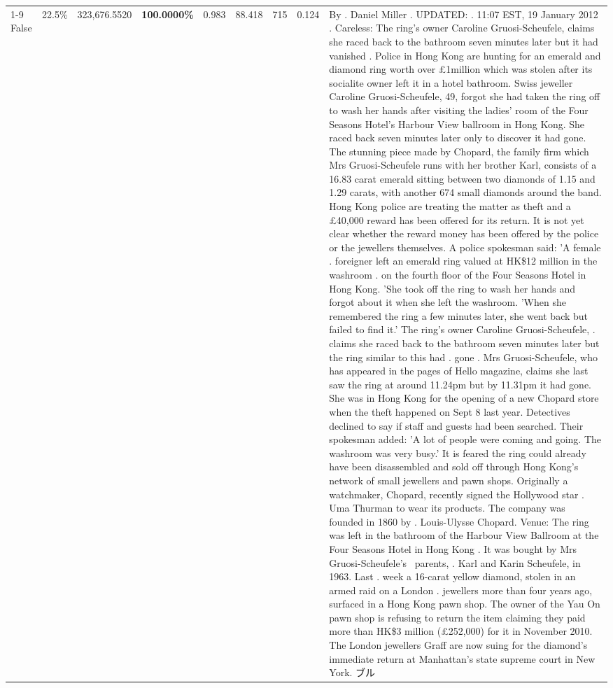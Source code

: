 \begin{table}[H]
\begin{tabular}{lllrlllll}
\cline{1-9} \cline{2-9}
False & 22.5\% & 323,676.5520 & \bfseries \color{red} 100.0000\% & 0.983 & 88.418 & 715 & 0.124 & By . Daniel Miller . UPDATED: . 11:07 EST, 19 January 2012 . Careless: The ring's owner Caroline Gruosi-Scheufele, claims she raced back to the bathroom seven minutes later but it had vanished . Police in Hong Kong are hunting for an emerald and diamond ring worth over £1million which was stolen after its socialite owner left it in a hotel bathroom. Swiss jeweller Caroline Gruosi-Scheufele, 49, forgot she had taken the ring off to wash her hands after visiting the ladies' room of the Four Seasons Hotel's Harbour View ballroom in Hong Kong. She raced back seven minutes later only to discover it had gone. The stunning piece made by Chopard, the family firm which Mrs Gruosi-Scheufele runs with her brother Karl, consists of a 16.83 carat emerald sitting between two diamonds of 1.15 and 1.29 carats, with another 674 small diamonds around the band. Hong Kong police are treating the matter as theft and a £40,000 reward has been offered for its return. It is not yet clear whether the reward money has been offered by the police or the jewellers themselves. A police spokesman said: 'A female . foreigner left an emerald ring valued at HK\$12 million in the washroom . on the fourth floor of the Four Seasons Hotel in Hong Kong. 'She took off the ring to wash her hands and forgot about it when she left the washroom. 'When she remembered the ring a few minutes later, she went back but failed to find it.' The ring's owner Caroline Gruosi-Scheufele, . claims she raced back to the bathroom seven minutes later but the ring similar to this had . gone . Mrs Gruosi-Scheufele, who has appeared in the pages of Hello magazine, claims she last saw the ring at around 11.24pm but by 11.31pm it had gone. She was in Hong Kong for the opening of a new Chopard store when the theft happened on Sept 8 last year. Detectives declined to say if staff and guests had been searched. Their spokesman added: 'A lot of people were coming and going. The washroom was very busy.' It is feared the ring could already have been disassembled and sold off through Hong Kong's network of small jewellers and pawn shops. Originally a watchmaker, Chopard, recently signed the Hollywood star . Uma Thurman to wear its products. The company was founded in 1860 by . Louis-Ulysse Chopard. Venue: The ring was left in the bathroom of the Harbour View Ballroom at the Four Seasons Hotel in Hong Kong . It was bought by Mrs Gruosi-Scheufele's  parents, . Karl and Karin Scheufele, in 1963. Last . week a 16-carat yellow diamond, stolen in an armed raid on a London . jewellers more than four years ago, surfaced in a Hong Kong pawn shop. The owner of the Yau On pawn shop is refusing to return the item claiming they paid more than HK\$3 million (£252,000) for it in November 2010. The London jewellers Graff are now suing for the diamond’s immediate return at Manhattan’s state supreme court in New York. ブル \\

\end{tabular}
\end{table}
